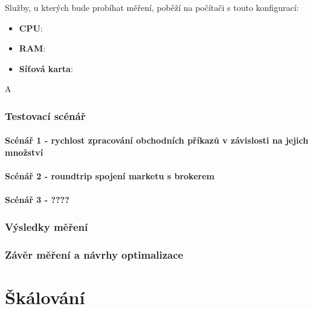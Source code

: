 \documentclass[thesis=M,czech]{FITthesis}[2012/06/26]
\begin{document}
	Služby, u kterých bude probíhat měření, poběží na počítači s touto konfigurací:
		
\begin{itemize}

\item \textbf{CPU}: 

\item \textbf{RAM}: 

\item \textbf{Síťová karta}:

\end{itemize}
	
	A 		
\subsection{Testovací scénář}

\subsubsection{Scénář 1 - rychlost zpracování obchodních příkazů v závislosti na jejich množství}

\subsubsection{Scénář 2 - roundtrip spojení marketu s brokerem}

\subsubsection{Scénář 3 - ????}

\subsection{Výsledky měření}

\subsection{Závěr měření a návrhy optimalizace}




\chapter{Škálování}
\label{chap:tunning}
\end{document}
